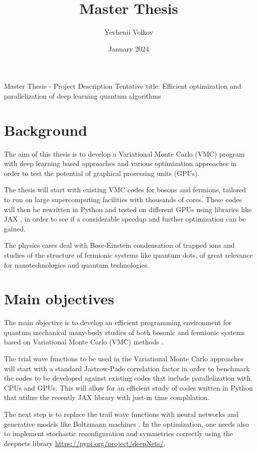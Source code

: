 \documentclass{article}
\title{Master Thesis}
\author{Yevhenii Volkov}
\date{January 2024}
\begin{document}
\maketitle  

Master Thesis - Project Description
Tentative title: Efficient optimization and parallelization of deep learning quantum algorithms

\section{Background}

The aim of this thesis is to develop a Variational Monte Carlo (VMC)
program with deep learning based approaches and various optimization approaches
in order to test the potential of graphical processing units (GPUs).

The thesis will start with existing VMC codes for bosons and fermions,
tailored to run on large supercomputing facilities with thousands of cores.
These codes will then be rewritten in Python and tested on different GPUs using libraries like JAX \cite{jax},
in order to see if a considerable speedup and further optimization can be gained.

The physics cases deal with Bose-Einstein condensation of trapped ions and
studies of the structure of fermionic systems like quantum dots, of
great relevance for nanotechnologies and quantum technologies.



\section{Main objectives}

The main objective is to develop an efficient programming environment
for quantum mechanical many-body studies of both bosonic and fermionic
systems based on Variational Monte Carlo (VMC) methods \cite{vmc,nilsen}.

The trial wave functions to be used in the Variational Monte Carlo
approaches will start with a standard Jastrow-Pade correlation factor
in order to benchmark the codes to be developed against existing
codes that include parallelization with CPUs and GPUs.
This will allow for an efficient study of codes written in Python that utilize the recently JAX \cite{jax}
library with just-in time complilation.

The next step is to replace the trail wave functions with neural
networks \cite{fore,kim} and generative models like Boltzmann machines
\cite{nordhagen}.  In the optimization, one needs also to implement
stochastic reconfiguration \cite{stochreconfig} and symmetries
correctly using the deepnets library
\url{https://pypi.org/project/deepNets/}.
\end{document}

